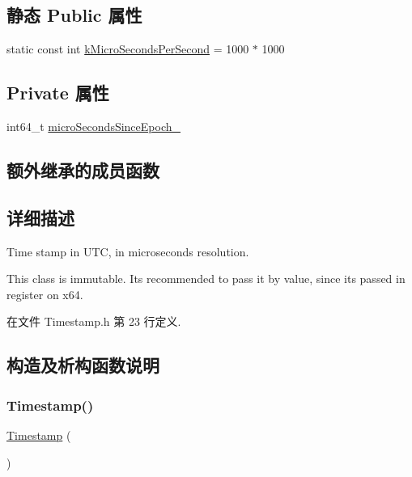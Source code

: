 \subsection*{静态 Public 属性}
\begin{DoxyCompactItemize}
\item 
static const int \hyperlink{classmuduo_1_1Timestamp_a2659197720e28bf9db3631a73f16f7ff}{k\+Micro\+Seconds\+Per\+Second} = 1000 $\ast$ 1000
\end{DoxyCompactItemize}
\subsection*{Private 属性}
\begin{DoxyCompactItemize}
\item 
int64\+\_\+t \hyperlink{classmuduo_1_1Timestamp_ad36b5d1f504a660a5e4386588d27346d}{micro\+Seconds\+Since\+Epoch\+\_\+}
\end{DoxyCompactItemize}
\subsection*{额外继承的成员函数}


\subsection{详细描述}
Time stamp in U\+TC, in microseconds resolution.

This class is immutable. It\textquotesingle{}s recommended to pass it by value, since it\textquotesingle{}s passed in register on x64. 

在文件 Timestamp.\+h 第 23 行定义.



\subsection{构造及析构函数说明}
\mbox{\label{classmuduo_1_1Timestamp_a3ccb273b45fb16b1b14de8a4c8b44e3b}} 
\subsubsection{\texorpdfstring{Timestamp()}{Timestamp()}\hspace{0.1cm}{\footnotesize\ttfamily [1/2]}}
{\footnotesize\ttfamily \hyperlink{classmuduo_1_1Timestamp}{Timestamp} (\begin{DoxyParamCaption}{ }\end{DoxyParamCaption})\hspace{0.3cm}{\ttfamily [inline]}}

